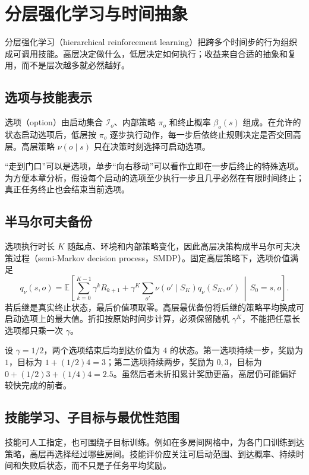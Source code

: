 \documentclass[UTF8,12pt,a4paper,fontset=fandol]{ctexbook}
\begin{document}
\chapter{分层强化学习与时间抽象}
\label{ch:rl-hierarchy}

分层强化学习（hierarchical reinforcement learning）把跨多个时间步的行为组织成可调用技能。高层决定做什么，低层决定如何执行；收益来自合适的抽象和复用，而不是层次越多就必然越好。

\section{选项与技能表示}

选项（option）由启动集合 $\mathcal I_o$、内部策略 $\pi_o$ 和终止概率 $\beta_o(s)$ 组成。在允许的状态启动选项后，低层按 $\pi_o$ 逐步执行动作，每一步后依终止规则决定是否交回高层。高层策略 $\nu(o\mid s)$ 只在决策时刻选择可启动选项。

“走到门口”可以是选项，单步“向右移动”可以看作立即在一步后终止的特殊选项。为方便本章分析，假设每个启动的选项至少执行一步且几乎必然在有限时间终止；真正任务终止也会结束当前选项。

\section{半马尔可夫备份}

选项执行时长 $K$ 随起点、环境和内部策略变化，因此高层决策构成半马尔可夫决策过程（semi-Markov decision process，SMDP）。固定高层策略下，选项价值满足
\[
q_\nu(s,o)=\mathbb E\!\left[\sum_{k=0}^{K-1}\gamma^kR_{k+1}
+\gamma^K\sum_{o'}\nu(o'\mid S_K)q_\nu(S_K,o')\,\middle|\,S_0=s,o\right].
\]
若后继是真实终止状态，最后价值项取零。高层最优备份将后继的策略平均换成可启动选项上的最大值。折扣按原始时间步计算，必须保留随机 $\gamma^K$，不能把任意长选项都只乘一次 $\gamma$。

\begin{example}[持续时间改变价值]
设 $\gamma=1/2$，两个选项结束后均到达价值为 $4$ 的状态。第一选项持续一步，奖励为 $1$，目标为 $1+(1/2)4=3$；第二选项持续两步，奖励为 $0,3$，目标为 $0+(1/2)3+(1/4)4=2.5$。虽然后者未折扣累计奖励更高，高层仍可能偏好较快完成的前者。
\end{example}

\section{技能学习、子目标与最优性范围}

技能可人工指定，也可围绕子目标训练。例如在多房间网格中，为各门口训练到达策略，高层再选择经过哪些房间。技能评价应关注可启动范围、到达概率、持续时间和失败后状态，而不只是子任务平均奖励。
\end{document}
